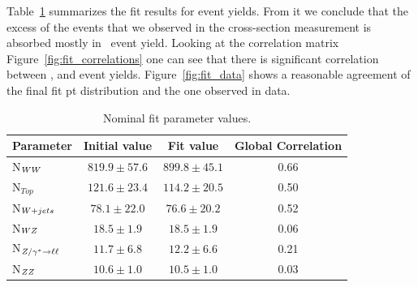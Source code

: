Table~\ref{tab:fit_yields} summarizes the fit results for event
yields. From it we conclude that the excess of the events that we
observed in the cross-section measurement is absorbed mostly in \ww\
event yield. Looking at the correlation matrix
Figure~\ref{fig:fit_correlations} one can see that there is
significant correlation between \ww{}, \wjets{} and \ttbar{} event
yields. Figure~\ref{fig:fit_data} shows a reasonable agreement of the
final fit pt distribution and the one observed in data. 



\begin{table}[!ht]
  \begin{center}
 {\small
  \begin{tabular} {|l|c|c|c|}
\hline
  Parameter       &   Initial value & Fit value & Global Correlation \\
\hline
  N$_{WW}$       & $819.9\pm57.6$  & $899.8\pm45.1$ & 0.66 \\
  N$_{Top}$       & $121.6\pm23.4$  & $114.2\pm20.5$ & 0.50 \\
  N$_{W+jets}$    & $78.1\pm22.0$   & $76.6\pm20.2$  & 0.52 \\
  N$_{WZ}$       & $18.5\pm1.9$    & $18.5\pm1.9$   & 0.06 \\
  N$_{Z/\gamma^*\to\ell\ell}$     & $11.7\pm6.8$    & $12.2\pm6.6$   & 0.21 \\
  N$_{ZZ}$       & $10.6\pm1.0$    & $10.5\pm1.0$   & 0.03 \\
\hline
  \end{tabular}
  }
  \caption{Nominal fit parameter values.}
   \label{tab:fit_yields}
  \end{center}
\end{table}

